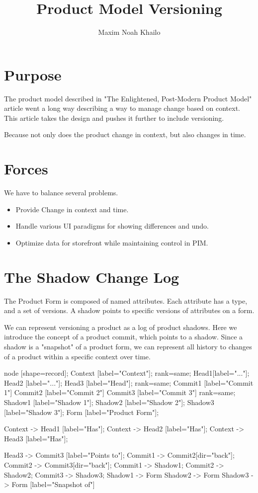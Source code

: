 \documentclass[11pt]{article}
\title{Product Model Versioning}
\author{Maxim Noah Khailo}
\begin{document}
\maketitle
\section{Purpose}

The product model described in "The Enlightened, Post-Modern Product Model" 
article went a long way describing a way to manage change based on context.
This article takes the design and pushes it further to include versioning.

Because not only does the product change in context, but also changes in time.

\section{Forces}

We have to balance several problems.

\begin{itemize}
    \item Provide Change in context and time.
    \item Handle various UI paradigms for showing differences and undo.
    \item Optimize data for storefront while maintaining control in PIM.
\end{itemize}

\section{The Shadow Change Log}

The Product Form is composed of named attributes. Each attribute has a type, and
a set of versions. A shadow points to specific versions of attributes on a form. 

We can represent versioning a product as a log of product shadows. Here we introduce
the concept of a product commit, which points to a shadow. Since a shadow is a
"snapshot" of a product form, we can represent all history to changes of a product
within a specific context over time.

 {
    node [shape=record];
    Context [label="Context"];
    {
        rank=same;
        Head1[label="..."];
        Head2 [label="..."];
        Head3 [label="Head"];
    }
    {
        rank=same;
        Commit1 [label="Commit 1"]
        Commit2 [label="Commit 2"]
        Commit3 [label="Commit 3"]
    }
    {
        rank=same;
        Shadow1 [label="Shadow 1"];
        Shadow2 [label="Shadow 2"];
        Shadow3 [label="Shadow 3"];
    }
    Form [label="Product Form"];

    Context -> Head1 [label="Has"];
    Context -> Head2 [label="Has"];
    Context -> Head3 [label="Has"];

    Head3 -> Commit3 [label="Points to"];
    Commit1 -> Commit2[dir="back"];
    Commit2 -> Commit3[dir="back"];
    Commit1 -> Shadow1;
    Commit2 -> Shadow2;
    Commit3 -> Shadow3;
    Shadow1 -> Form 
    Shadow2 -> Form 
    Shadow3 -> Form [label="Snapshot of"]
}
\end{document}
